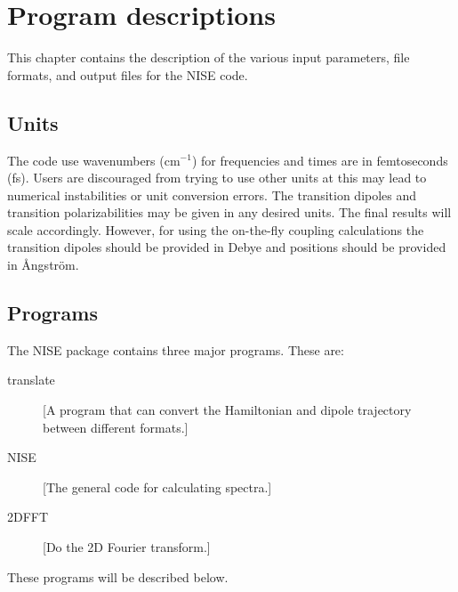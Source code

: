 \chapter{Program descriptions}
This chapter contains the description of the various input parameters, file formats, and output files for the NISE code.
\section{Units}
The code use wavenumbers (cm$^{-1}$) for frequencies and times are in femtoseconds (fs). Users are discouraged from trying to use other units at this may lead to numerical instabilities or unit conversion errors. The transition dipoles and transition polarizabilities may be given in any desired units. The final results will scale accordingly. However, for using the on-the-fly coupling calculations the transition dipoles should be provided in Debye and positions should be provided in \AA ngstr\"{o}m. 

\section{Programs}
The NISE package contains three major programs. These are:
\begin{description}
\item [translate] [A program that can convert the Hamiltonian and dipole trajectory between different formats.]
\item [NISE] [The general code for calculating spectra.]
\item [2DFFT] [Do the 2D Fourier transform.]
\end{description}
These programs will be described below. 

